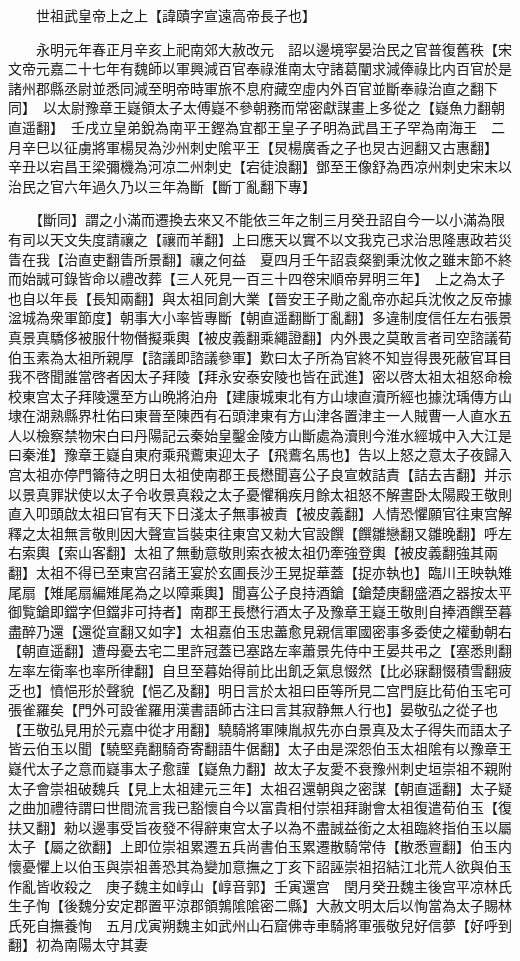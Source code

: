 　　世祖武皇帝上之上【諱賾字宣遠高帝長子也】

　　永明元年春正月辛亥上祀南郊大赦改元　詔以邊境寜晏治民之官普復舊秩【宋文帝元嘉二十七年有魏師以軍興減百官奉祿淮南太守諸葛闡求減俸祿比内百官於是諸州郡縣丞尉並悉同減至明帝時軍旅不息府藏空虛内外百官並斷奉祿治直之翻下同】　以太尉豫章王嶷領太子太傅嶷不參朝務而常密獻謀畫上多從之【嶷魚力翻朝直遥翻】　壬戌立皇弟銳為南平王鏗為宜都王皇子子明為武昌王子罕為南海王　二月辛巳以征虜將軍楊炅為沙州刺史隂平王【炅楊廣香之子也炅古迥翻又古惠翻】　辛丑以宕昌王梁彌機為河凉二州刺史【宕徒浪翻】鄧至王像舒為西凉州刺史宋末以治民之官六年過久乃以三年為斷【斷丁亂翻下專】

　　【斷同】謂之小滿而遷換去來又不能依三年之制三月癸丑詔自今一以小滿為限有司以天文失度請禳之【禳而羊翻】上曰應天以實不以文我克己求治思隆惠政若災眚在我【治直吏翻眚所景翻】禳之何益　夏四月壬午詔袁粲劉秉沈攸之雖末節不終而始誠可錄皆命以禮改葬【三人死見一百三十四卷宋順帝昇明三年】　上之為太子也自以年長【長知兩翻】與太祖同創大業【晉安王子勛之亂帝亦起兵沈攸之反帝據湓城為衆軍節度】朝事大小率皆專斷【朝直遥翻斷丁亂翻】多違制度信任左右張景真景真驕侈被服什物僭擬乘輿【被皮義翻乘繩證翻】内外畏之莫敢言者司空諮議荀伯玉素為太祖所親厚【諮議即諮議參軍】歎曰太子所為官終不知豈得畏死蔽官耳目我不啓聞誰當啓者因太子拜陵【拜永安泰安陵也皆在武進】密以啓太祖太祖怒命檢校東宫太子拜陵還至方山晩將泊舟【建康城東北有方山埭直瀆所經也據沈瑀傳方山埭在湖熟縣界杜佑曰東晉至陳西有石頭津東有方山津各置津主一人賊曹一人直水五人以檢察禁物宋白曰丹陽記云秦始皇鑿金陵方山斷處為瀆則今淮水經城中入大江是曰秦淮】豫章王嶷自東府乘飛鷰東迎太子【飛鷰名馬也】告以上怒之意太子夜歸入宫太祖亦停門籥待之明日太祖使南郡王長懋聞喜公子良宣敇詰責【詰去吉翻】并示以景真罪狀使以太子令收景真殺之太子憂懼稱疾月餘太祖怒不解晝卧太陽殿王敬則直入叩頭啟太祖曰官有天下日淺太子無事被責【被皮義翻】人情恐懼願官往東宫解釋之太祖無言敬則因大聲宣旨裝束往東宫又勑大官設饌【饌雛戀翻又雛晚翻】呼左右索輿【索山客翻】太祖了無動意敬則索衣被太祖仍牽強登輿【被皮義翻強其兩翻】太祖不得已至東宫召諸王宴於玄圃長沙王晃捉華蓋【捉亦執也】臨川王映執雉尾扇【雉尾扇編雉尾為之以障乘輿】聞喜公子良持酒鎗【鎗楚庚翻盛酒之器按太平御覧鎗即鐺字但鐺非可持者】南郡王長懋行酒太子及豫章王嶷王敬則自捧酒饌至暮盡醉乃還【還從宣翻又如字】太祖嘉伯玉忠藎愈見親信軍國密事多委使之權動朝右【朝直遥翻】遭母憂去宅二里許冠蓋已塞路左率蕭景先侍中王晏共弔之【塞悉則翻左率左衛率也率所律翻】自旦至暮始得前比出飢乏氣息惙然【比必寐翻惙積雪翻疲乏也】憤悒形於聲貌【悒乙及翻】明日言於太祖曰臣等所見二宫門庭比荀伯玉宅可張雀羅矣【門外可設雀羅用漢書語師古注曰言其寂静無人行也】晏敬弘之從子也【王敬弘見用於元嘉中從才用翻】驍騎將軍陳胤叔先亦白景真及太子得失而語太子皆云伯玉以聞【驍堅堯翻騎奇寄翻語牛倨翻】太子由是深怨伯玉太祖隂有以豫章王嶷代太子之意而嶷事太子愈謹【嶷魚力翻】故太子友愛不衰豫州刺史垣崇祖不親附太子會崇祖破魏兵【見上太祖建元三年】太祖召還朝與之密謀【朝直遥翻】太子疑之曲加禮待謂曰世間流言我已豁懷自今以富貴相付崇祖拜謝會太祖復遣荀伯玉【復扶又翻】勑以邊事受旨夜發不得辭東宫太子以為不盡誠益銜之太祖臨終指伯玉以屬太子【屬之欲翻】上即位崇祖累遷五兵尚書伯玉累遷散騎常侍【散悉亶翻】伯玉内懷憂懼上以伯玉與崇祖善恐其為變加意撫之丁亥下詔誣崇祖招結江北荒人欲與伯玉作亂皆收殺之　庚子魏主如崞山【崞音郭】壬寅還宫　閏月癸丑魏主後宫平凉林氏生子恂【後魏分安定郡置平涼郡領鶉隂隂密二縣】大赦文明太后以恂當為太子賜林氏死自撫養恂　五月戊寅朔魏主如武州山石窟佛寺車騎將軍張敬兒好信夢【好呼到翻】初為南陽太守其妻

